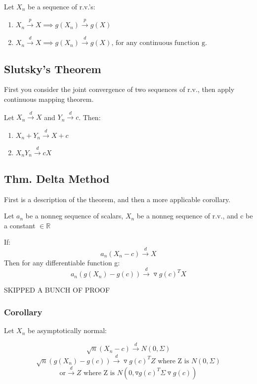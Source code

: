 \documentclass[aos,preprint]{imsart}
\numberwithin{equation}{section}
\theoremstyle{plain}
\begin{document}
Let $ X_n $ be a sequence of r.v.'s: 

\begin{enumerate}
\item $X_n \xrightarrow{p} X \implies g(X_n) \xrightarrow{p} g(X)  $
\item $X_n \xrightarrow{d} X \implies g(X_n) \xrightarrow{d} g(X) \text{, for any continuous function g. }  $
\end{enumerate}


\subsection{Slutsky's Theorem}
First you consider the joint convergence of two sequences of r.v., then apply continuous mapping theorem. 

Let $ X_n \xrightarrow{d} X $ and $ Y_n \xrightarrow{d} c $. Then: 

\begin{enumerate}
\item $X_n + Y_n \xrightarrow{d} X + c  $
\item $X_n Y_n \xrightarrow{d} cX  $
\end{enumerate}


\subsection{Thm. Delta Method}

First is a description of the theorem, and then a more applicable corollary. 

Let $a_n$ be a nonneg sequence of scalars, $X_n$ be a nonneg sequence of r.v., and c be a constant $ \in \mathbb{R} $

If: 
$$ a_n (X_n - c) \xrightarrow{d} X $$
Then for any differentiable function g: 
$$ a_n (g(X_n) -  g(c)) \xrightarrow{d} \triangledown g(c)^T X $$

SKIPPED A BUNCH OF PROOF

\subsubsection{Corollary}

Let $X_n$ be asymptotically normal: 

$$ \sqrt{n}(X_n - c) \xrightarrow{d} N(0,\Sigma) $$ 
$$ \sqrt{n}(g(X_n) - g(c)) \xrightarrow{d}   \triangledown g(c)^T Z \text { where Z is } N(0,\Sigma) $$ 
$$ \text{or} \xrightarrow{d}  Z  \text { where Z is } N(0, \triangledown g(c)^T  \Sigma  \triangledown g(c) ) $$ 
\end{document}

